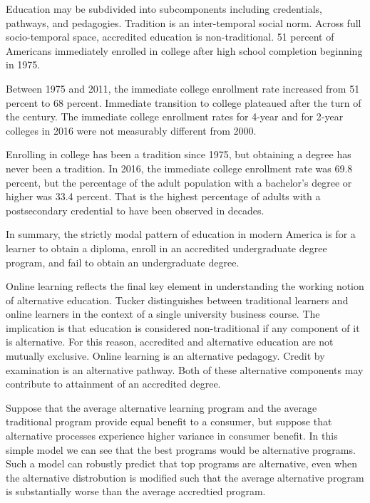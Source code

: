 \documentclass[AER]{./aea-latex-templates/AEA}
\begin{document}
Education may be subdivided into subcomponents including credentials, pathways,
and pedagogies. Tradition is an inter-temporal social norm. Across
full socio-temporal space, accredited education is non-traditional. 51
percent of Americans immediately enrolled in college after high school completion
beginning in 1975\cite{aud2013condition}.

Between 1975 and 2011, the immediate college enrollment
rate increased from 51 percent to 68 percent. Immediate transition to
college plateaued after the turn of the century. The immediate college
enrollment rates for 4-year and for 2-year colleges in 2016 were not
measurably different from 2000\cite{nces2019condition}.

Enrolling in college has been a tradition since 1975, but obtaining a
degree has never been a tradition. In 2016, the immediate college
enrollment rate was 69.8 percent\cite{nces_2019}, but the
percentage of the adult population with a bachelor’s degree or higher was
33.4 percent\cite{censusbureau_2017}. That is the highest percentage of
adults with a postsecondary credential to have been observed in decades.

In summary, the strictly modal pattern of education in modern America
is for a learner to obtain a diploma, enroll in an accredited undergraduate degree
program, and fail to obtain an undergraduate degree.

Online learning reflects the final key element in understanding the working notion of
alternative education. Tucker\cite{tucker2001distance} distinguishes between traditional
learners and online learners in the context of a single university business course.
The implication is that education is considered non-traditional if any component of it
is alternative. For this reason, accredited and alternative education are not mutually exclusive.
Online learning is an alternative pedagogy. Credit by examination is an alternative
pathway. Both of these alternative components may contribute to attainment of an accredited degree.

Suppose that the average alternative learning program and the average traditional program
provide equal benefit to a consumer, but suppose that alternative
processes experience higher variance in consumer benefit. In this
simple model we can see that the best programs would be alternative
programs. Such a model can robustly predict that top programs are
alternative, even when the alternative distrobution is modified such
that the average alternative program is substantially worse than the
average accredtied program.
\end{document}
